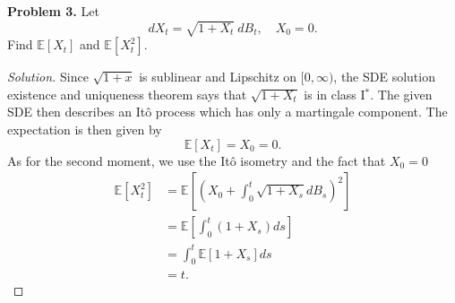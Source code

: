 \documentclass[11pt,letterpaper]{report}
\newcommand{\E}{\mathbb{E}}
\newenvironment{solution}
{\begin{proof}[Solution]}
{\end{proof}}
\begin{document}
\noindent\textbf{Problem 3. }
Let
\[
dX_t = \sqrt{1+X_t}\ dB_t,\quad X_0 = 0.
\]
Find $\E[X_t]$ and $\E[X_t^2]$.
\begin{solution}
	Since $\sqrt{1+x}$ is sublinear and Lipschitz on $[0, \infty)$, the SDE solution existence and uniqueness theorem says that $\sqrt{1+X_t}$ is in class I$^*$. The given SDE then describes an It\^o process which has only a martingale component. The expectation is then given by
	\[
	\E[X_t] = X_0 = 0.
	\]
	As for the second moment, we use the It\^o isometry and the fact that $X_0 = 0$
	\begin{align*}
		\E[X_t^2] &= \E\left[\left(X_0 + \int_0^t\sqrt{1+X_s}dB_s\right)^2 \right]\\
		&= \E\left[\int_0^t(1+X_s)ds \right]\\
		&= \int_0^t\E[1+X_s]ds\\
		&= t.
	\end{align*}
\end{solution}
\end{document}
